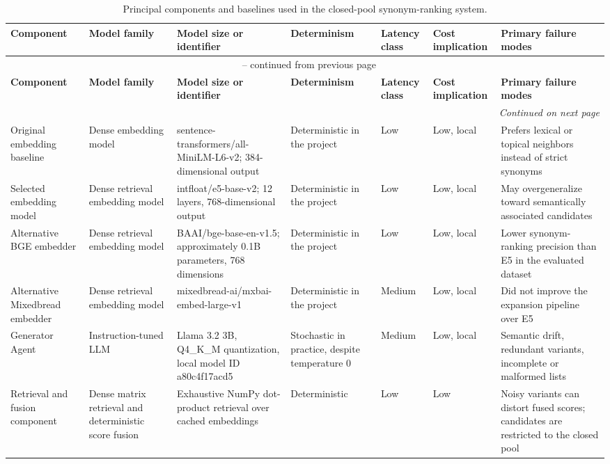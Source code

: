 \begingroup
\footnotesize
\setlength{\tabcolsep}{3pt}
\begin{longtable}{p{1.85cm}p{1.95cm}p{2.7cm}p{1.6cm}p{1.1cm}p{1.5cm}p{2.5cm}}
\caption{Principal components and baselines used in the closed-pool synonym-ranking system.}\label{tab:components}\\
\toprule
\textbf{Component} & \textbf{Model family} & \textbf{Model size or identifier} & \textbf{Determinism} & \textbf{Latency class} & \textbf{Cost implication} & \textbf{Primary failure modes}\\
\midrule
\endfirsthead
\multicolumn{7}{c}{\tablename\ \thetable{} -- continued from previous page}\\
\toprule
\textbf{Component} & \textbf{Model family} & \textbf{Model size or identifier} & \textbf{Determinism} & \textbf{Latency class} & \textbf{Cost implication} & \textbf{Primary failure modes}\\
\midrule
\endhead
\midrule
\multicolumn{7}{r}{\textit{Continued on next page}}\\
\endfoot
\bottomrule
\endlastfoot
Original embedding baseline & Dense embedding model & sentence-transformers/all-MiniLM-L6-v2; 384-dimensional output & Deterministic in the project & Low & Low, local & Prefers lexical or topical neighbors instead of strict synonyms\\
Selected embedding model & Dense retrieval embedding model & intfloat/e5-base-v2; 12 layers, 768-dimensional output & Deterministic in the project & Low & Low, local & May overgeneralize toward semantically associated candidates\\
Alternative BGE embedder & Dense retrieval embedding model & BAAI/bge-base-en-v1.5; approximately 0.1B parameters, 768 dimensions & Deterministic in the project & Low & Low, local & Lower synonym-ranking precision than E5 in the evaluated dataset\\
Alternative Mixedbread embedder & Dense retrieval embedding model & mixedbread-ai/mxbai-embed-large-v1 & Deterministic in the project & Medium & Low, local & Did not improve the expansion pipeline over E5\\
Generator Agent & Instruction-tuned LLM & Llama 3.2 3B, Q4\_K\_M quantization, local model ID a80c4f17acd5 & Stochastic in practice, despite temperature 0 & Medium & Low, local & Semantic drift, redundant variants, incomplete or malformed lists\\
Retrieval and fusion component & Dense matrix retrieval and deterministic score fusion & Exhaustive NumPy dot-product retrieval over cached embeddings & Deterministic & Low & Low & Noisy variants can distort fused scores; candidates are restricted to the closed pool\\

\end{longtable}
